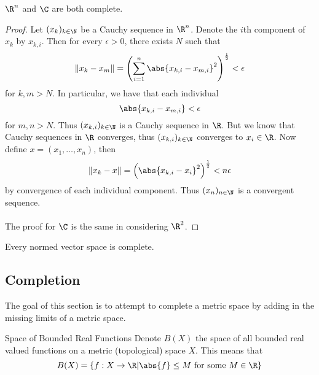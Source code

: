 \begin{prp}{}{} $\R^n$ and $\C$ are both complete. \tcbline
\begin{proof}
Let $(x_k)_{k\in\N}$ be a Cauchy sequence in $\R^n$. Denote the $i$th component of $x_k$ by $x_{k,i}$. Then for every $\epsilon>0$, there exists $N$ such that $$\|x_k-x_m\|=\left(\sum_{i=1}^n\abs{x_{k,i}-x_{m,i}}^2\right)^{\frac{1}{2}}<\epsilon$$ for $k,m>N$. In particular, we have that each individual $$\abs{x_{k,i}-x_{m,i}}<\epsilon$$ for $m,n>N$. Thus $(x_{k,i})_{k\in\N}$ is a Cauchy sequence in $\R$. But we know that Cauchy sequences in $\R$ converges, thus $(x_{k,i})_{k\in\N}$ converges to $x_i\in\R$. Now define $x=(x_1,\dots,x_n)$, then $$\|x_k-x\|=\left(\abs{x_{k,i}-x_i}^2\right)^{\frac{1}{2}}<n\epsilon$$ by convergence of each individual component. Thus $(x_n)_{n\in\N}$ is a convergent sequence. \\~\\
The proof for $\C$ is the same in considering $\R^2$. 
\end{proof}
\end{prp}

\begin{prp}{}{} Every normed vector space is complete. 
\end{prp}

\subsection{Completion}
The goal of this section is to attempt to complete a metric space by adding in the missing limits of a metric space. 

\begin{defn}{Space of Bounded Real Functions}{} Denote $B(X)$ the space of all bounded real valued functions on a metric (topological) space $X$. This means that $$B(X)=\{f:X\to\R|\abs{f}\leq M\text{ for some }M\in\R\}$$
\end{defn}

